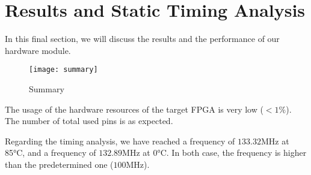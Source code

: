 \section{Results and Static Timing Analysis}
In this final section, we will discuss the results and the performance of our hardware module.
\begin{figure}[!ht]
    \centering
    \texttt{[image: summary]}
    \caption{Summary}
    \label{fig:summary}
\end{figure}

The usage of the hardware resources of the target FPGA is very low ($< 1\%$). The number of total used pins is as expected.

Regarding the timing analysis, we have reached a frequency of $133.32$MHz at 85°C, and a frequency of $132.89$MHz at 0°C. In both case, the frequency is higher than the predetermined one ($100$MHz).